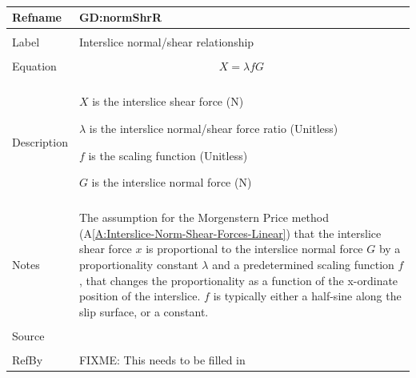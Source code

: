 \documentclass[12pt]{article}
\begin{document}
~\newline
\noindent \begin{minipage}{\textwidth}
\begin{tabular}{p{} p{}}
\toprule \textbf{Refname} & \textbf{GD:normShrR}
\label{GD:normShrR}
\\ \midrule \\
Label & Interslice normal/shear relationship
\\ \midrule \\
Equation & \begin{dmath}
           X=λ f G
           \end{dmath}
\\ \midrule \\
Description & \begin{symbDescription}
              \item{$X$ is the interslice shear force (N)}
              \item{$λ$ is the interslice normal/shear force ratio (Unitless)}
              \item{$f$ is the scaling function (Unitless)}
              \item{$G$ is the interslice normal force (N)}
              \end{symbDescription}
\\ \midrule \\
Notes & The assumption for the Morgenstern Price method (A\ref{A:Interslice-Norm-Shear-Forces-Linear}) that the interslice shear force $x$ is proportional to the interslice normal force $G$ by a proportionality constant $λ$ and a predetermined scaling function $f$, that changes the proportionality as a function of the x-ordinate position of the interslice. $f$ is typically either a half-sine along the slip surface, or a constant.
\\ \midrule \\
Source &
\\ \midrule \\
RefBy & FIXME: This needs to be filled in
\\ \bottomrule \end{tabular}
\end{minipage}\\
~\newline
\end{document}
